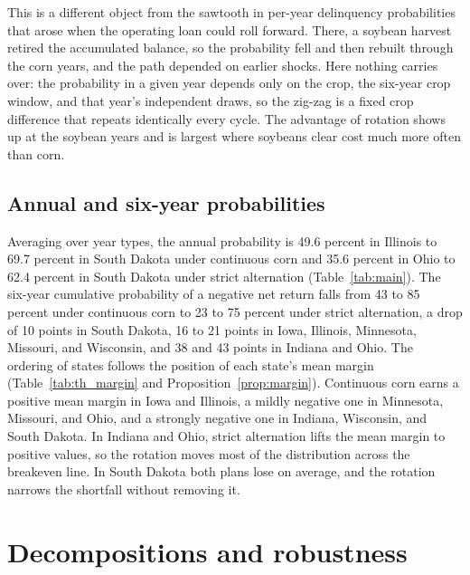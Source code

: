 \documentclass[11pt,letterpaper]{article}
\theoremstyle{remark}
\begin{document}
This is a different object from the sawtooth in per-year delinquency probabilities that arose when the operating loan could roll forward. There, a soybean harvest retired the accumulated balance, so the probability fell and then rebuilt through the corn years, and the path depended on earlier shocks. Here nothing carries over: the probability in a given year depends only on the crop, the six-year crop window, and that year's independent draws, so the zig-zag is a fixed crop difference that repeats identically every cycle. The advantage of rotation shows up at the soybean years and is largest where soybeans clear cost much more often than corn.

\subsection{Annual and six-year probabilities}

\begin{table}[H]
\centering
\caption{Breakeven probabilities, medium NCCPI zone (percent). Annual: $\Pr(R_t<K_t)$ in a given year. Cumulative: $\Pr(\sum_t (R_t-K_t)<0)$ over six years. Gap: strict alternation minus continuous corn, annual, in percentage points.}
\label{tab:main}

\end{table}

Averaging over year types, the annual probability is 49.6 percent in Illinois to 69.7 percent in South Dakota under continuous corn and 35.6 percent in Ohio to 62.4 percent in South Dakota under strict alternation (Table~\ref{tab:main}). The six-year cumulative probability of a negative net return falls from 43 to 85 percent under continuous corn to 23 to 75 percent under strict alternation, a drop of 10 points in South Dakota, 16 to 21 points in Iowa, Illinois, Minnesota, Missouri, and Wisconsin, and 38 and 43 points in Indiana and Ohio. The ordering of states follows the position of each state's mean margin (Table~\ref{tab:th_margin} and Proposition~\ref{prop:margin}). Continuous corn earns a positive mean margin in Iowa and Illinois, a mildly negative one in Minnesota, Missouri, and Ohio, and a strongly negative one in Indiana, Wisconsin, and South Dakota. In Indiana and Ohio, strict alternation lifts the mean margin to positive values, so the rotation moves most of the distribution across the breakeven line. In South Dakota both plans lose on average, and the rotation narrows the shortfall without removing it.

\section{\label{sec:robustness}Decompositions and robustness}
\end{document}
